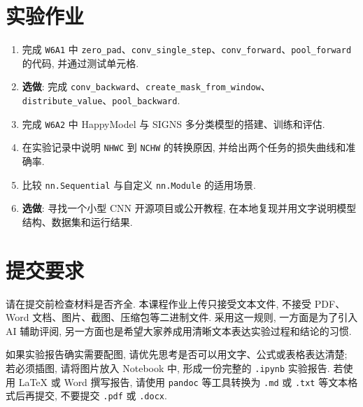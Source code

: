 \documentclass{../../nndlcourse}
\begin{document}
\section{实验作业}
\begin{enumerate}
    \item 完成 \texttt{W6A1} 中 \texttt{zero\_pad}、\texttt{conv\_single\_step}、\texttt{conv\_forward}、\texttt{pool\_forward} 的代码, 并通过测试单元格.
    \item \textbf{选做}: 完成 \texttt{conv\_backward}、\texttt{create\_mask\_from\_window}、\texttt{distribute\_value}、\texttt{pool\_backward}.
    \item 完成 \texttt{W6A2} 中 HappyModel 与 SIGNS 多分类模型的搭建、训练和评估.
    \item 在实验记录中说明 \texttt{NHWC} 到 \texttt{NCHW} 的转换原因, 并给出两个任务的损失曲线和准确率.
    \item 比较 \texttt{nn.Sequential} 与自定义 \texttt{nn.Module} 的适用场景.
    \item \textbf{选做}: 寻找一个小型 CNN 开源项目或公开教程, 在本地复现并用文字说明模型结构、数据集和运行结果.
\end{enumerate}


\section{提交要求}

请在提交前检查材料是否齐全. 本课程作业上传只接受文本文件, 不接受 PDF、Word 文档、图片、截图、压缩包等二进制文件. 采用这一规则, 一方面是为了引入 AI 辅助评阅, 另一方面也是希望大家养成用清晰文本表达实验过程和结论的习惯.

如果实验报告确实需要配图, 请优先思考是否可以用文字、公式或表格表达清楚; 若必须插图, 请将图片放入 Notebook 中, 形成一份完整的 \texttt{.ipynb} 实验报告. 若使用 \LaTeX{} 或 Word 撰写报告, 请使用 \texttt{pandoc} 等工具转换为 \texttt{.md} 或 \texttt{.txt} 等文本格式后再提交, 不要提交 \texttt{.pdf} 或 \texttt{.docx}.
\end{document}
